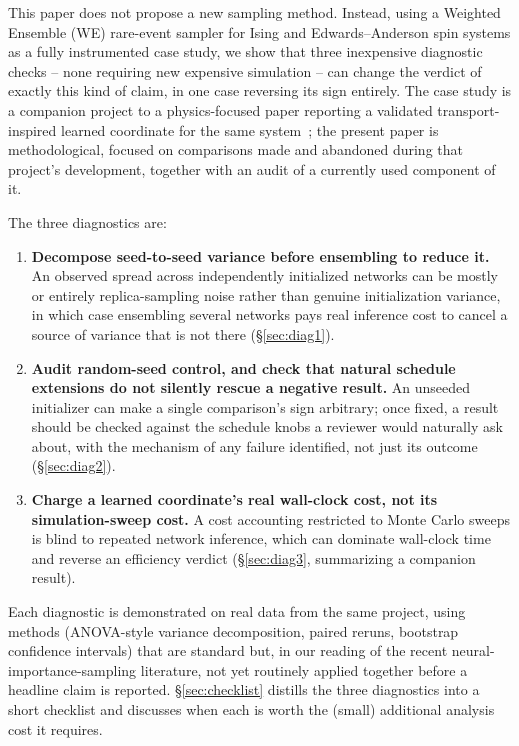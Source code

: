 \documentclass[a4paper,fleqn]{cas-sc}
\begin{document}
This paper does not propose a new sampling method. Instead, using a Weighted
Ensemble (WE) rare-event sampler for Ising and Edwards--Anderson spin systems
as a fully instrumented case study, we show that three inexpensive
diagnostic checks -- none requiring new expensive simulation -- can change
the verdict of exactly this kind of claim, in one case reversing its sign
entirely. The case study is a companion project to a physics-focused paper
reporting a validated transport-inspired learned coordinate for the same
system~\citep{alzaatreh2026}; the present paper is methodological, focused on
comparisons made and abandoned during that project's development, together
with an audit of a currently used component of it.

The three diagnostics are:

\begin{enumerate}[label=(\arabic*)]
\item \textbf{Decompose seed-to-seed variance before ensembling to reduce
it.} An observed spread across independently initialized networks can be
mostly or entirely replica-sampling noise rather than genuine
initialization variance, in which case ensembling several networks pays real
inference cost to cancel a source of variance that is not there
(\S\ref{sec:diag1}).
\item \textbf{Audit random-seed control, and check that natural schedule
extensions do not silently rescue a negative result.} An unseeded
initializer can make a single comparison's sign arbitrary; once fixed, a
result should be checked against the schedule knobs a reviewer would
naturally ask about, with the mechanism of any failure identified, not just
its outcome (\S\ref{sec:diag2}).
\item \textbf{Charge a learned coordinate's real wall-clock cost, not its
simulation-sweep cost.} A cost accounting restricted to Monte Carlo sweeps is
blind to repeated network inference, which can dominate wall-clock time and
reverse an efficiency verdict (\S\ref{sec:diag3}, summarizing a companion
result).
\end{enumerate}

Each diagnostic is demonstrated on real data from the same project, using
methods (ANOVA-style variance decomposition, paired reruns, bootstrap
confidence intervals) that are standard but, in our reading of the recent
neural-importance-sampling literature, not yet routinely applied together
before a headline claim is reported. \S\ref{sec:checklist} distills the three
diagnostics into a short checklist and discusses when each is worth the
(small) additional analysis cost it requires.
\end{document}
